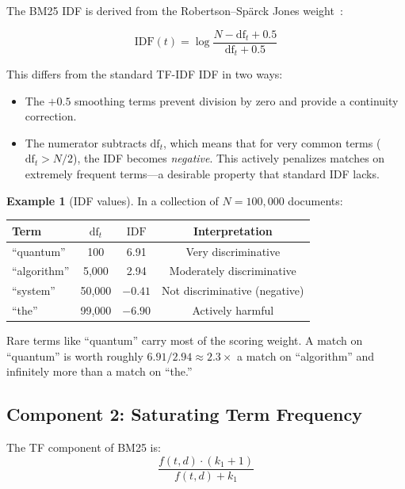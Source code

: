 \documentclass[11pt,a4paper]{article}
\theoremstyle{definition}
\newtheorem{example}{Example}[section]
\theoremstyle{plain}
\begin{document}
The BM25 IDF is derived from the Robertson--Sp\"arck Jones weight~\cite{robertson1976relevance}:

\begin{equation}
\text{IDF}(t) = \log \frac{N - \text{df}_t + 0.5}{\text{df}_t + 0.5}
\label{eq:bm25idf}
\end{equation}

This differs from the standard TF-IDF IDF in two ways:
\begin{itemize}
    \item The $+0.5$ smoothing terms prevent division by zero and provide a continuity correction.
    \item The numerator subtracts $\text{df}_t$, which means that for very common terms ($\text{df}_t > N/2$), the IDF becomes \emph{negative}. This actively penalizes matches on extremely frequent terms---a desirable property that standard IDF lacks.
\end{itemize}

\begin{example}[IDF values]
In a collection of $N = 100{,}000$ documents:
\begin{center}
\begin{tabular}{lccc}
\toprule
\textbf{Term} & $\text{df}_t$ & $\text{IDF}$ & \textbf{Interpretation} \\
\midrule
``quantum'' & 100 & 6.91 & Very discriminative \\
``algorithm'' & 5{,}000 & 2.94 & Moderately discriminative \\
``system'' & 50{,}000 & $-0.41$ & Not discriminative (negative) \\
``the'' & 99{,}000 & $-6.90$ & Actively harmful \\
\bottomrule
\end{tabular}
\end{center}
Rare terms like ``quantum'' carry most of the scoring weight. A match on ``quantum'' is worth roughly $6.91 / 2.94 \approx 2.3\times$ a match on ``algorithm'' and infinitely more than a match on ``the.''
\end{example}

\subsection{Component 2: Saturating Term Frequency}

The TF component of BM25 is:
\begin{equation}
\frac{f(t,d) \cdot (k_1 + 1)}{f(t,d) + k_1}
\label{eq:saturation}
\end{equation}
\end{document}
